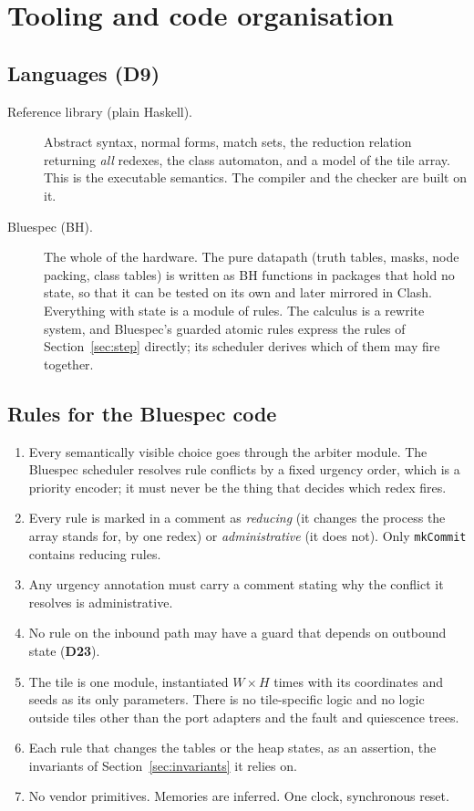 \documentclass[11pt]{article}
\newcommand{\kw}[1]{\texttt{#1}}
\newcommand{\dec}[1]{\textbf{D#1}}
\theoremstyle{definition}
\theoremstyle{remark}
\begin{document}
\section{Tooling and code organisation}\label{sec:tooling}

\subsection{Languages (\dec{9})}

\begin{description}
\item[Reference library (plain Haskell).] Abstract syntax, normal forms,
match sets, the reduction relation returning \emph{all} redexes, the class
automaton, and a model of the tile array. This is the executable semantics.
The compiler and the checker are built on it.
\item[Bluespec (BH).] The whole of the hardware. The pure datapath (truth
tables, masks, node packing, class tables) is written as BH functions in
packages that hold no state, so that it can be tested on its own and later
mirrored in Clash. Everything with state is a module of rules. The calculus
is a rewrite system, and Bluespec's guarded atomic rules express the rules
of Section~\ref{sec:step} directly; its scheduler derives which of them may
fire together.
\end{description}

\subsection{Rules for the Bluespec code}

\begin{enumerate}
\item Every semantically visible choice goes through the arbiter module.
The Bluespec scheduler resolves rule conflicts by a fixed urgency order,
which is a priority encoder; it must never be the thing that decides which
redex fires.
\item Every rule is marked in a comment as \emph{reducing} (it changes the
process the array stands for, by one redex) or \emph{administrative} (it
does not). Only \kw{mkCommit} contains reducing rules.
\item Any urgency annotation must carry a comment stating why the conflict
it resolves is administrative.
\item No rule on the inbound path may have a guard that depends on outbound
state (\dec{23}).
\item The tile is one module, instantiated $W \times H$ times with its
coordinates and seeds as its only parameters. There is no tile-specific
logic and no logic outside tiles other than the port adapters and the fault
and quiescence trees.
\item Each rule that changes the tables or the heap states, as an assertion,
the invariants of Section~\ref{sec:invariants} it relies on.
\item No vendor primitives. Memories are inferred. One clock, synchronous
reset.
\end{enumerate}
\end{document}
